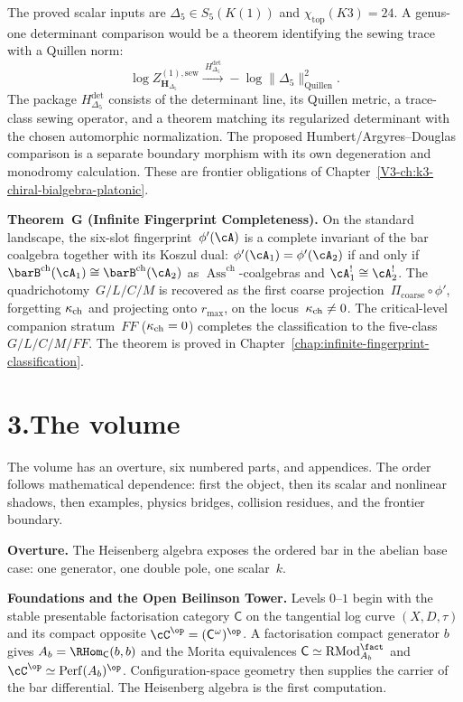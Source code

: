 The proved scalar inputs are
$\Delta_5\in S_5(K(1))$ and
$\chi_{\mathrm{top}}(K3)=24$.  A genus-one determinant comparison
would be a theorem identifying the sewing trace with a Quillen norm:
\[
\log Z^{(1),\mathrm{sew}}_{\mathbf H_{\Delta_5}}
\xrightarrow{\ H_{\Delta_5}^{\mathrm{det}}\ }
-\log\bigl\|\Delta_5\bigr\|^2_{\mathrm{Quillen}}.
\]
The package $H_{\Delta_5}^{\mathrm{det}}$ consists of the determinant
line, its Quillen metric, a trace-class sewing operator, and a theorem
matching its regularized determinant with the chosen automorphic
normalization.  The proposed Humbert/Argyres--Douglas comparison is a
separate boundary morphism with its own degeneration and monodromy
calculation.  These are frontier obligations of
Chapter~\ref{V3-ch:k3-chiral-bialgebra-platonic}.

\medskip

\noindent\textbf{Theorem~G (Infinite Fingerprint Completeness).}\enspace
On the standard landscape, the six-slot fingerprint~$\phi'(\cA)$ is
a complete invariant of the bar coalgebra together with its Koszul
dual: $\phi'(\cA_1) = \phi'(\cA_2)$ if and only if
$\barB^{\mathrm{ch}}(\cA_1)\cong\barB^{\mathrm{ch}}(\cA_2)$ as
$\operatorname{Ass}^{\mathrm{ch}}$-coalgebras and
$\cA_1^{!}\cong\cA_2^{!}$. The quadrichotomy~$G/L/C/M$ is recovered
as the first coarse projection~$\Pi_{\mathrm{coarse}}\circ\phi'$,
forgetting $\kappa_{\mathrm{ch}}$ and projecting onto $r_{\max}$, on the
locus~$\kappa_{\mathrm{ch}}\ne 0$. The critical-level companion stratum~$FF$
($\kappa_{\mathrm{ch}} = 0$) completes the classification to the five-class
$G/L/C/M/FF$. The theorem is proved in
Chapter~\ref{chap:infinite-fingerprint-classification}.

\section*{3.\quad The volume}

\noindent
The volume has an overture, six numbered parts, and appendices. The
order follows mathematical dependence: first the object, then its
scalar and nonlinear shadows, then examples, physics bridges,
collision residues, and the frontier boundary.

\medskip

\noindent\textbf{Overture.}\enspace
The Heisenberg algebra exposes the ordered bar in the abelian base
case: one generator, one double pole, one scalar~$k$.

\medskip

\noindent\textbf{Foundations and the Open Beilinson Tower.}\enspace
Levels $0$--$1$ begin with the stable presentable factorisation
category $\mathsf C$ on the tangential log curve $(X,D,\tau)$ and its
compact opposite $\cC^\op=(\mathsf C^\omega)^\op$.  A factorisation
compact generator $b$ gives
$A_b=\RHom_{\mathsf C}(b,b)$ and the Morita equivalences
$\mathsf C\simeq\mathrm{RMod}^{\fact}_{A_b}$ and
$\cC^\op\simeq\mathrm{Perf}(A_b)^\op$.  Configuration-space geometry
then supplies the carrier of the bar differential.  The Heisenberg
algebra is the first computation.

